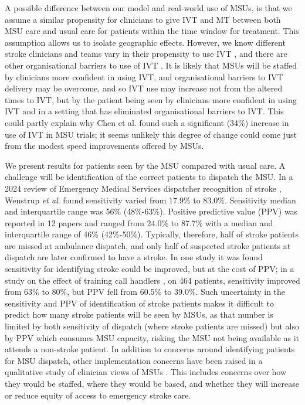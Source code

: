 A possible difference between our model and real-world use of MSUs, is that we assume a similar propensity for clinicians to give IVT and MT between both MSU care and usual care for patients within the time window for treatment. This assumption allows us to isolate geographic effects. However, we know different stroke clinicians and teams vary in their propensity to use IVT \cite{de_brun_factors_2018, pearn_what_2023}, and there are other organisational barriers to use of IVT \cite{meurer_provider_2011}. It is likely that MSUs will be staffed by clinicians more confident in using IVT, and organisational barriers to IVT delivery may be overcome, and so IVT use may increase not from the altered times to IVT, but by the patient being seen by clinicians more confident in using IVT and in a setting that has eliminated organisational barriers to IVT. This could partly explain why Chen et al. \cite{chen_systematic_2022} found such a significant (34\%) increase in use of IVT in MSU trials; it seems unlikely this degree of change could come just from the modest speed improvements offered by MSUs.

We present results for patients seen by the MSU compared with usual care. A challenge will be identification of the correct patients to dispatch the MSU. In a 2024 review of Emergency Medical Services dispatcher recognition of stroke \cite{wenstrup_emergency_2024}, Wenstrup \textit{et al}. found sensitivity varied from 17.9\% to 83.0\%. Sensitivity median and interquartile range was 56\% (48\%-63\%). Positive predictive value (PPV) was reported in 12 papers and ranged from 24.0\% to 87.7\% with a median and interquartile range of 46\% (42\%-50\%). Typically, therefore, half of stroke patients are missed at ambulance dispatch, and only half of suspected stroke patients at dispatch are later confirmed to have a stroke. In one study it was found sensitivity for identifying stroke could be improved, but at the cost of PPV; in a study on the effect of training call handlers \cite{watkins_training_2013}, on 464 patients, sensitivity improved from 63\% to 80\%, but PPV fell from 60.5\% to 39.0\%. Such uncertainty in the sensitivity and PPV of identification of stroke patients makes it difficult to predict how many stroke patients will be seen by MSUs, as that number is limited by both sensitivity of dispatch (where stroke patients are missed) but also by PPV which consumes MSU capacity, risking the MSU not being available as it attends a non-stroke patient. In addition to concerns around identifying patients for MSU dispatch, other implementation concerns have been raised in a qualitative study of clinician views of MSUs \cite{moseley_practitioner_2024}. This includes concerns over how they would be staffed, where they would be based, and whether they will increase or reduce equity of access to emergency stroke care.

